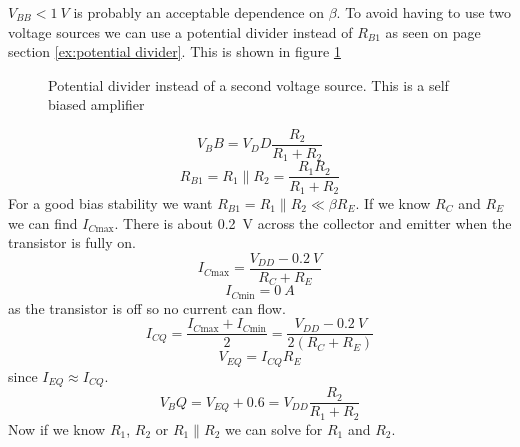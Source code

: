\documentclass{article}
\begin{document}
    \(V_{BB} < \SI{1}{V}\) is probably an acceptable dependence on \(\beta\).
    To avoid having to use two voltage sources we can use a potential divider instead of \(R_{B1}\) as seen on page \pageref{ex:potential divider} section \ref{ex:potential divider}. This is shown in figure \ref{fig:potential divider second voltage source}
    \begin{figure}[ht]
        \centering
        \caption{Potential divider instead of a second voltage source. This is a self biased amplifier}
        \label{fig:potential divider second voltage source}
    \end{figure}
    \[V_BB = V_DD\frac{R_2}{R_1 + R_2}\]
    \[R_{B1} = R_1\parallel R_2 = \frac{R_1R_2}{R_1 + R_2}\]
    For a good bias stability we want \(R_{B1} = R_1\parallel R_2 \ll \beta R_E\).
    If we know \(R_C\) and \(R_E\) we can find \(I_{C\text{max}}\).
    There is about \SI{0.2}{V} across the collector and emitter when the transistor is fully on.
    \[I_{C\text{max}} = \frac{V_{DD} - \SI{0.2}{V}}{R_C + R_E}\]
    \[I_{C\text{min}} = \SI{0}{A}\]
    as the transistor is off so no current can flow.
    \[I_{CQ} = \frac{I_{C\text{max}} + I_{C\text{min}}}{2} = \frac{V_{DD} - \SI{0.2}{V}}{2(R_C + R_E)}\]
    \[V_{EQ} = I_{CQ}R_E\]
    since \(I_{EQ}\approx I_{CQ}\).
    \[V_BQ = V_{EQ} + 0.6 = V_{DD}\frac{R_2}{R_1 + R_2}\]
    Now if we know \(R_1\), \(R_2\) or \(R_1\parallel R_2\) we can solve for \(R_1\) and \(R_2\).
    
\end{document}
